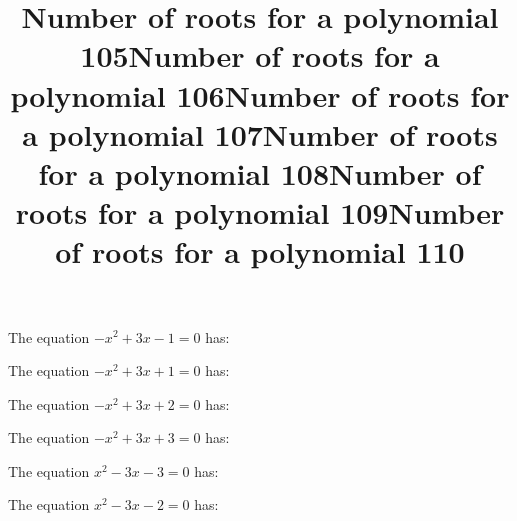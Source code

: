 \documentclass{article}
\begin{document}
\begin{category}
\begin{question}[multichoice]

\end{question}
\begin{question}[multichoice]
\title{Number of roots for a polynomial 105}
The equation $- x^{2} + 3 x - 1=0$ has:


\end{question}
\begin{question}[multichoice]
\title{Number of roots for a polynomial 106}
The equation $- x^{2} + 3 x + 1=0$ has:


\end{question}
\begin{question}[multichoice]
\title{Number of roots for a polynomial 107}
The equation $- x^{2} + 3 x + 2=0$ has:


\end{question}
\begin{question}[multichoice]
\title{Number of roots for a polynomial 108}
The equation $- x^{2} + 3 x + 3=0$ has:


\end{question}
\begin{question}[multichoice]
\title{Number of roots for a polynomial 109}
The equation $x^{2} - 3 x - 3=0$ has:


\end{question}
\begin{question}[multichoice]
\title{Number of roots for a polynomial 110}
The equation $x^{2} - 3 x - 2=0$ has:



\end{question}
\end{category}
\end{document}

